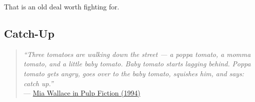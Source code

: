 \documentclass[11pt,a4paper,oneside,openright]{article}
\begin{document}
That is an old deal worth fighting for.

\subsection{Catch-Up}
\begin{quote}
	\emph{``Three tomatoes are walking down the street --- a poppa tomato, a momma tomato, and a little baby tomato. 
	Baby tomato starts lagging behind. 
	Poppa tomato gets angry, goes over to the baby tomato, squishes him, and says: catch up.''} \\
	--- \href{http://www.youtube.com/watch?v=5D-QKY0-Bxk}{Mia Wallace in Pulp Fiction (1994)}
\end{quote}





	
	
\end{document}
